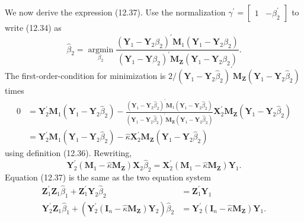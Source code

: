 \documentclass[10pt]{article}
\begin{document}
We now derive the expression (12.37). Use the normalization $\gamma^{\prime}=\left[\begin{array}{ll}1 & -\beta_{2}^{\prime}\end{array}\right]$ to write (12.34) as
$$
\widehat{\beta}_{2}=\underset{\beta_{2}}{\operatorname{argmin}} \frac{\left(\boldsymbol{Y}_{1}-\boldsymbol{Y}_{2} \beta_{2}\right)^{\prime} \boldsymbol{M}_{1}\left(\boldsymbol{Y}_{1}-\boldsymbol{Y}_{2} \beta_{2}\right)}{\left(\boldsymbol{Y}_{1}-\boldsymbol{Y} \beta_{2}\right)^{\prime} \boldsymbol{M}_{\boldsymbol{Z}}\left(\boldsymbol{Y}_{1}-\boldsymbol{Y}_{2} \beta_{2}\right)} .
$$
The first-order-condition for minimization is $2 /\left(\boldsymbol{Y}_{1}-\boldsymbol{Y}_{2} \widehat{\beta}_{2}\right)^{\prime} \boldsymbol{M}_{\boldsymbol{Z}}\left(\boldsymbol{Y}_{1}-\boldsymbol{Y}_{2} \widehat{\beta}_{2}\right)$ times
$$
\begin{aligned}
0 &=\boldsymbol{Y}_{2}^{\prime} \boldsymbol{M}_{1}\left(\boldsymbol{Y}_{1}-\boldsymbol{Y}_{2} \widehat{\beta}_{2}\right)-\frac{\left(\boldsymbol{Y}_{1}-\boldsymbol{Y}_{2} \widehat{\beta}_{2}\right)^{\prime} \boldsymbol{M}_{1}\left(\boldsymbol{Y}_{1}-\boldsymbol{Y}_{2} \widehat{\beta}_{2}\right)}{\left(\boldsymbol{Y}_{1}-\boldsymbol{Y}_{2} \widehat{\beta}_{2}\right)^{\prime} \boldsymbol{M}_{\boldsymbol{Z}}\left(\boldsymbol{Y}_{1}-\boldsymbol{Y}_{2} \widehat{\beta}_{2}\right)} \boldsymbol{X}_{2}^{\prime} \boldsymbol{M}_{\boldsymbol{Z}}\left(\boldsymbol{Y}_{1}-\boldsymbol{Y}_{2} \widehat{\beta}_{2}\right) \\
&=\boldsymbol{Y}_{2}^{\prime} \boldsymbol{M}_{1}\left(\boldsymbol{Y}_{1}-\boldsymbol{Y}_{2} \widehat{\beta}_{2}\right)-\widehat{\kappa} \boldsymbol{X}_{2}^{\prime} \boldsymbol{M}_{\boldsymbol{Z}}\left(\boldsymbol{Y}_{1}-\boldsymbol{Y}_{2} \widehat{\beta}_{2}\right)
\end{aligned}
$$
using definition (12.36). Rewriting,
$$
\boldsymbol{Y}_{2}^{\prime}\left(\boldsymbol{M}_{1}-\widehat{\kappa} \boldsymbol{M}_{\boldsymbol{Z}}\right) \boldsymbol{X}_{2} \widehat{\beta}_{2}=\boldsymbol{X}_{2}^{\prime}\left(\boldsymbol{M}_{1}-\widehat{\kappa} \boldsymbol{M}_{\boldsymbol{Z}}\right) \boldsymbol{Y}_{1} .
$$
Equation (12.37) is the same as the two equation system
$$
\begin{aligned}
\boldsymbol{Z}_{1}^{\prime} \boldsymbol{Z}_{1} \widehat{\beta}_{1}+\boldsymbol{Z}_{1}^{\prime} \boldsymbol{Y}_{2} \widehat{\beta}_{2} &=\boldsymbol{Z}_{1}^{\prime} \boldsymbol{Y}_{1} \\
\boldsymbol{Y}_{2}^{\prime} \boldsymbol{Z}_{1} \widehat{\beta}_{1}+\left(\boldsymbol{Y}_{2}^{\prime}\left(\boldsymbol{I}_{n}-\widehat{\kappa} \boldsymbol{M}_{\boldsymbol{Z}}\right) \boldsymbol{Y}_{2}\right) \widehat{\beta}_{2} &=\boldsymbol{Y}_{2}^{\prime}\left(\boldsymbol{I}_{n}-\widehat{\kappa} \boldsymbol{M}_{\boldsymbol{Z}}\right) \boldsymbol{Y}_{1} .
\end{aligned}
$$
\end{document}
